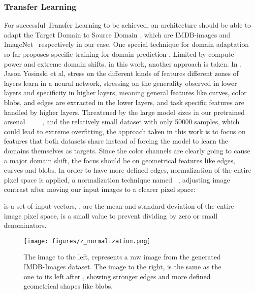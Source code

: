 \documentclass[conference]{IEEEtran}
\begin{document}
\subsubsection{Transfer Learning}
                For successful Transfer Learning to be achieved, an architecture should
				be able to adapt the Target Domain  to Source Domain
				, which are IMDB-images and ImageNet~\cite{imagenet} respectively in our case. One special technique for domain adaptation so far proposes specific  training for domain prediction \cite{ganin2016domain}.
				Limited by compute power and extreme domain shifts, in this work, another
				approach is taken.
				In \cite{howtransferable}, Jason Yosinski et al, stress on the different kinds of features different zones of layers learn in a neural network, stressing on the generality observed in lower layers and specificity in higher layers, meaning general features like curves, color blobs, and edges are extracted in the lower layers, and task specific features are handled by higher layers. 
				Threatened by the large model sizes in our pretrained arsenal~\cite{alexnet}~\cite{shufflenetv2}~\cite{vgg16}~\cite{resnet}~\cite{resnext}, and the relatively small dataset with only 50000 samples, which could lead to extreme overfitting, the approach taken in this work is to focus on features that both datasets share instead of forcing the 
				model to learn the domains themselves as targets. Since the color
				channels are clearly going to cause a major domain shift, the focus should
				be on geometrical features like edges, curves and blobs. In order to 
				have more defined edges, normalization of the entire pixel space is 
				applied, a normalization technique named ~\cite{normimproving}, adjusting image contrast after moving our input images to a clearer pixel space:
				
				       
				 is a set of input vectors,
				,  are the mean and standard deviation of the entire image pixel space, 
				 is a small value to prevent dividing by zero or small denominators.
				
				\begin{figure}[htbp]
                \centerline{\texttt{[image: figures/z\_normalization.png]}}
                \caption{The image to the left, represents a raw image from the generated IMDB-Images dataset. The image to the right, is the same as the one to its left after , showing stronger edges and more defined geometrical shapes like blobs.}
                \label{figure-4}
                \end{figure}
                
\end{document}
